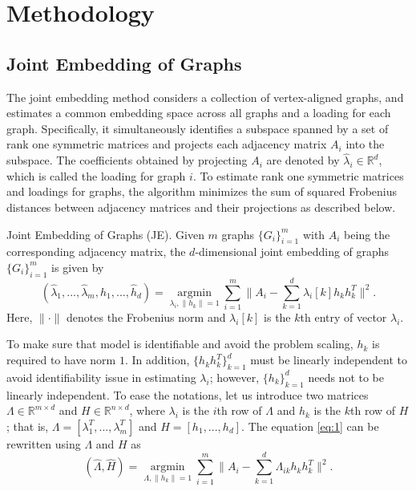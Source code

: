 \documentclass[10pt,journal,compsoc]{IEEEtran}
\newenvironment{definition}[1][Definition]{\begin{trivlist}
		\item[\hskip \labelsep {\bfseries #1}]}{\end{trivlist}}
\begin{document}
\section{Methodology}
\subsection{Joint Embedding of Graphs}
The joint embedding method considers a collection of vertex-aligned graphs, and estimates a common embedding space across all graphs and a loading for each graph. Specifically, it simultaneously identifies a subspace spanned by a set of rank one symmetric matrices and projects each adjacency matrix $A_i$ into the subspace. The coefficients obtained by projecting $A_i$ are denoted by $\hat{\lambda}_i \in \mathbb{R}^d$, which is called the loading for graph $i$. To estimate rank one symmetric matrices and loadings for graphs, the algorithm minimizes the sum of squared Frobenius distances between adjacency matrices and their projections as described below.
\begin{definition} Joint Embedding of Graphs (JE). Given $m$ graphs $\{G_i \} _{i=1}^{m}$ with $A_i$ being the corresponding adjacency matrix, the $d$-dimensional joint embedding of graphs $\{G_i \} _{i=1}^{m}$ is given by
\begin{equation}\label{eq:1}
 (\hat{\lambda}_1,...,\hat{\lambda}_m,\hat{h}_1,...,\hat{h}_d) = \underset{\lambda_i,\|h_k\|=1}{\operatorname{argmin}} \sum\limits_{i=1}^{m} \| A_i- \sum\limits_{k=1}^{d} \lambda_{i}[k] h_k h_k^T \|  ^2.  
\end{equation}
Here, $\| \cdot \|$ denotes the Frobenius norm and $\lambda_{i}[k]$ is the $k$th entry of vector $\lambda_i$.
\end{definition}
To make sure that model is identifiable and avoid the problem scaling, $h_k$ is required to have norm $1$. In addition, $\{h_k h_k^T\}_{k=1}^d$ must be linearly independent to avoid identifiability issue in estimating $\lambda_i$; however, $\{h_k\}_{k=1}^d$ needs not to be linearly independent. To ease the notations, let us introduce two matrices $\Lambda \in \mathbb{R}^{m \times d}$ and $H\in \mathbb{R}^{n \times d}$, where $\lambda_i$ is the $i$th row of $\Lambda$ and $h_k$ is the $k$th row of $H$; that is, $\Lambda=[\lambda_1^T,...,\lambda_m^T]$ and $H=[h_1,...,h_d]$. The equation \eqref{eq:1} can be rewritten using $\Lambda$ and $H$ as
\begin{equation*}
(\hat{\Lambda},\hat{H}) = \underset{\Lambda,\|h_k\|=1}{\operatorname{argmin}} \sum\limits_{i=1}^{m} \| A_i- \sum\limits_{k=1}^{d} \Lambda_{ik} h_k h_k^T \|  ^2.  
\end{equation*}
\end{document}
